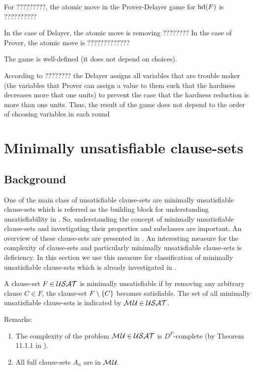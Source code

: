 \documentclass{report}
\begin{document}
\begin{defi}\label{def:atomicmovegraph}
For ?????????, the atomic move in the Prover-Delayer game for $\operatorname{hd}(F)$ is ??????????

In the case of Delayer, the atomic move is removing ????????
In the case of Prover, the atomic move is ?????????????
\end{defi}

\begin{lem}\label{lem:Tseitingame1}
The game is well-defined (it does not depend on choices). 
\end{lem}
\begin{prf}
According to ???????? the Delayer assigns all variables that are trouble maker (the variables that Prover can assign a value to them such that the hardness decreases more that one units) to prevent the case that the hardness reduction is more than one units. Thus, the result of the game does not depend to the order of choosing variables in each round
\end{prf}

\chapter{Minimally unsatisfiable clause-sets}
\label{cha:mucls}

\section{Background}
\label{sec:basicdef}

One of the main class of unsatisfiable clause-sets are minimally unsatisfiable clause-sets which is referred as the building block for understanding unsatisfiability in \cite{h9}. So, understanding the concept of minimally unsatisfiable clause-sets and investigating their properties and subclasses are important. An overview of these clause-sets are presented in \cite{h9, h25,h29}. An interesting measure for the complexity of clause-sets and particularly minimally unsatisfiable clause-sets is deficiency. In this section we use this measure for classification of minimally unsatisfiable clause-sets which is already investigated in \cite{h9, h25,h26,h24, h27}.

\begin{defi}\label{def:mu}
A clause-set $F \in \mathcal{USAT}$ is minimally unsatisfiable if by removing any arbitrary clause $C \in F$, the clause-set $F \setminus \{ C \}$ becomes satisfiable. The set of all minimally unsatisfiable clause-sets is indicated by $\mathcal{M\hspace{0.8pt}U} \in \mathcal{USAT}$.
\end{defi}
Remarks:
  \begin{enumerate}
  \item The complexity of the problem $\mathcal{M\hspace{0.8pt}U} \in \mathcal{USAT}$ is $D^P$-complete (by Theorem 11.1.1 in \cite{h25}).
  \item All full clause-sets $ A_n$ are in $\mathcal{M\hspace{0.8pt}U}_{\!}$.
  \end{enumerate}
\end{document}
